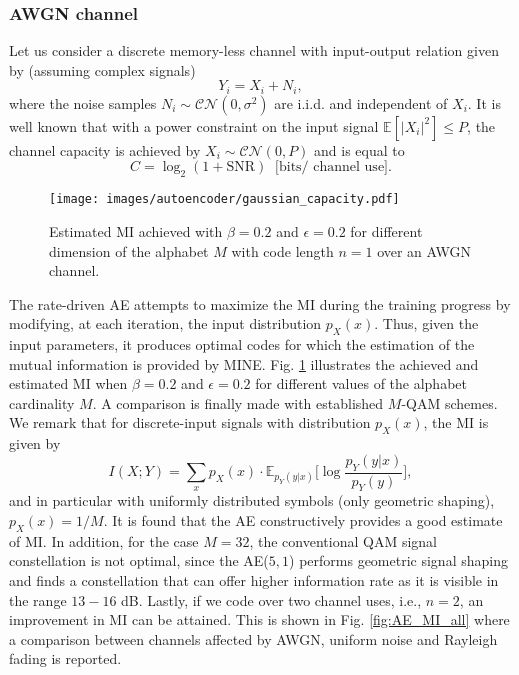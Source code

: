 \subsubsection{AWGN channel}
Let us consider a discrete memory-less channel with input-output relation given by (assuming complex signals)
\begin{equation}
\label{eq:AE_additive_noise}
Y_i=X_i+N_i,
\end{equation}
where the noise samples $N_i\sim \mathcal{CN}(0,\sigma^2)$ are i.i.d. and independent of $X_i$. It is well known that with a power constraint on the input signal $\mathbb{E}[|X_i|^2] \leq P$, the channel capacity is achieved by $X_i\sim \mathcal{CN}(0,P)$ and is equal to
\begin{equation}
C = \log_2(1+\text{SNR}) \; \; \text{[bits/ channel use]}.
\end{equation}

\begin{figure}
	\centering
	\texttt{[image: images/autoencoder/gaussian\_capacity.pdf]}
	\caption{Estimated MI achieved with $\beta=0.2$ and $\epsilon=0.2$ for different dimension of the alphabet $M$ with code length $n=1$ over an AWGN channel.}
	\label{fig:AE_gaussian_capacity}
\end{figure}
The rate-driven AE attempts to maximize the MI during the training progress by modifying, at each iteration, the input distribution $p_X(x)$. Thus, given the input parameters, it produces optimal codes for which the estimation of the mutual information is provided by MINE. Fig. \ref{fig:AE_gaussian_capacity} illustrates the achieved and estimated MI when $\beta=0.2$ and $\epsilon=0.2$ for different values of the alphabet cardinality $M$. A comparison is finally made with established $M$-QAM schemes. We remark that for discrete-input signals with distribution $p_X(x)$, the MI is given by
\begin{equation}
I(X;Y) = \sum_x p_X(x)\cdot \mathbb{E}_{p_Y(y|x)}\biggl[\log \frac{p_Y(y|x)}{p_Y(y)}\biggr],
\end{equation}
and in particular with uniformly distributed symbols (only
geometric shaping), $p_X(x)=1/M$. It is found that the AE constructively provides a good estimate of MI. In addition, for the case $M=32$, the conventional QAM signal constellation is not optimal, since the AE($5,1$) performs geometric signal shaping and finds a constellation that can offer higher information rate as it is visible in the range $13-16$ dB. Lastly, if we code over two channel uses, i.e., $n=2$, an improvement in MI can be attained. This is shown in Fig. \ref{fig:AE_MI_all} where a comparison between channels affected by AWGN, uniform noise and Rayleigh fading is reported.  



